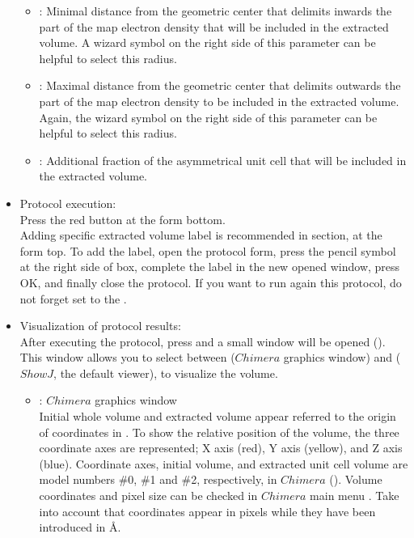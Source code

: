 \begin{itemize}
\begin{itemize}
  \item {}: Minimal distance from the geometric center that delimits inwards the part of the map electron density that will be included in the extracted volume. A wizard symbol on the right side of this parameter can be helpful to select this radius.\\
  \item {}: Maximal distance from the geometric center that delimits outwards the part of the map electron density to be included in the extracted volume. Again, the wizard symbol on the right side of this parameter can be helpful to select this radius.\\
  \item {}: Additional fraction of the asymmetrical unit cell that will be included in the extracted volume.\\
  \end{itemize}

  \item Protocol execution:\\
  
  Press the  red button at the form bottom.\\
  Adding specific extracted volume label is recommended in  section, at the form top. To add the label, open the protocol form, press the pencil symbol at the right side of  box, complete the label in the new opened window, press OK, and finally close the protocol. If you want to run again this protocol, do not forget set to  the .\\
  
  \item Visualization of protocol results:\\
  
  After executing the protocol, press  and a small window will be opened (). This window allows you to select between  ($Chimera$ graphics window) and  ($ShowJ$, the default \scipion viewer), to visualize the volume.
   
   \begin{itemize}
   \item {}: $Chimera$ graphics window\\
   
   Initial whole volume and extracted volume appear referred to the origin of coordinates in \chimera. To show the relative position of the volume, the three coordinate axes are represented; X axis (red), Y axis (yellow), and Z axis (blue). Coordinate axes, initial volume, and extracted unit cell volume are model numbers \#0, \#1 and \#2, respectively, in $Chimera$  (). Volume coordinates and pixel size can be checked in $Chimera$ main menu . Take into account that coordinates appear in pixels while they have been introduced in \AA.\\
   

\end{itemize}
\end{itemize}
